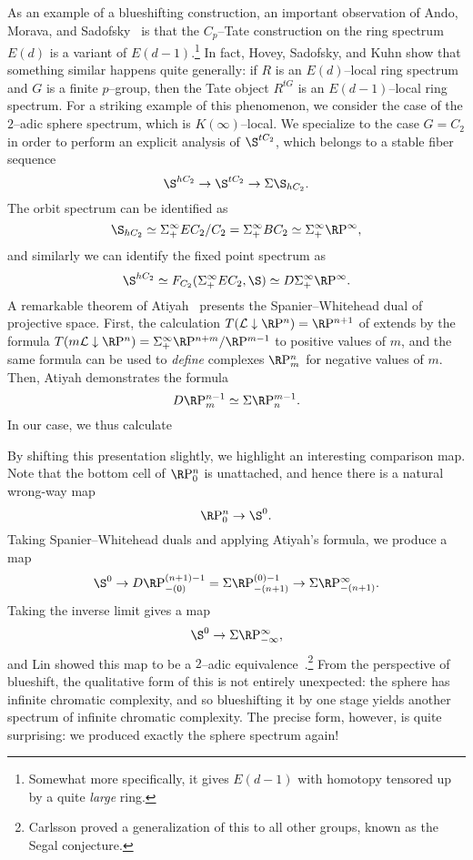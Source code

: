 As an example of a blueshifting construction, an important observation of Ando, Morava, and Sadofsky~\cite{AMS} is that the \(C_p\)--Tate construction on the ring spectrum \(E(d)\) is a variant of \(E(d-1)\).\footnote{Somewhat more specifically, it gives \(E(d-1)\) with homotopy tensored up by a quite \emph{large} ring.}  In fact, Hovey, Sadofsky, and Kuhn show that something similar happens quite generally: if \(R\) is an \(E(d)\)--local ring spectrum and \(G\) is a finite \(p\)--group, then the Tate object \(R^{tG}\) is an \(E(d-1)\)--local ring spectrum.  For a striking example of this phenomenon, we consider the case of the \(2\)--adic sphere spectrum, which is \(K(\infty)\)--local.  We specialize to the case \(G = C_2\) in order to perform an explicit analysis of \(\S^{tC_2}\), which belongs to a stable fiber sequence \[\S^{hC_2} \to \S^{tC_2} \to \Susp \S_{hC_2}.\]  The orbit spectrum can be identified as \[\S_{hC_2} \simeq \Susp^\infty_+ EC_2 / C_2 = \Susp^\infty_+ BC_2 \simeq \Susp^\infty_+ \RP^\infty,\] and similarly we can identify the fixed point spectrum as \[\S^{hC_2} \simeq F_{C_2}(\Susp^\infty_+ EC_2, \S) \simeq D\Susp^\infty_+ \RP^\infty.\]  A remarkable theorem of Atiyah~\cite{Atiyah} presents the Spanier--Whitehead dual of projective space.  First, the calculation \(T(\mathcal L \downarrow \RP^n) = \RP^{n+1}\) of  extends by the formula \(T(m \mathcal L \downarrow \RP^n) = \Susp^\infty_+ \RP^{n+m} / \RP^{m-1}\) to positive values of \(m\), and the same formula can be used to \emph{define} complexes \(\RP^n_m\) for negative values of \(m\).  Then, Atiyah demonstrates the formula \[D \RP^{n-1}_m \simeq \Susp \RP^{m-1}_n.\]  In our case, we thus calculate
\begin{center}
\end{center}
By shifting this presentation slightly, we highlight an interesting comparison map.  Note that the bottom cell of \(\RP^n_0\) is unattached, and hence there is a natural wrong-way map \[\RP^n_0 \to \S^0.\]  Taking Spanier--Whitehead duals and applying Atiyah's formula, we produce a map \[\S^0 \to D \RP^{(n+1)-1}_{-(0)} = \Susp \RP^{(0)-1}_{-(n+1)} \to \Susp \RP^\infty_{-(n+1)}.\]  Taking the inverse limit gives a map \[\S^0 \to \Susp \RP^\infty_{-\infty},\] and Lin showed this map to be a \(2\)--adic equivalence~\cite{Lin}.\footnote{Carlsson proved a generalization of this to all other groups, known as the Segal conjecture.}  From the perspective of blueshift, the qualitative form of this is not entirely unexpected: the sphere has infinite chromatic complexity, and so blueshifting it by one stage yields another spectrum of infinite chromatic complexity.  The precise form, however, is quite surprising: we produced exactly the sphere spectrum again!

